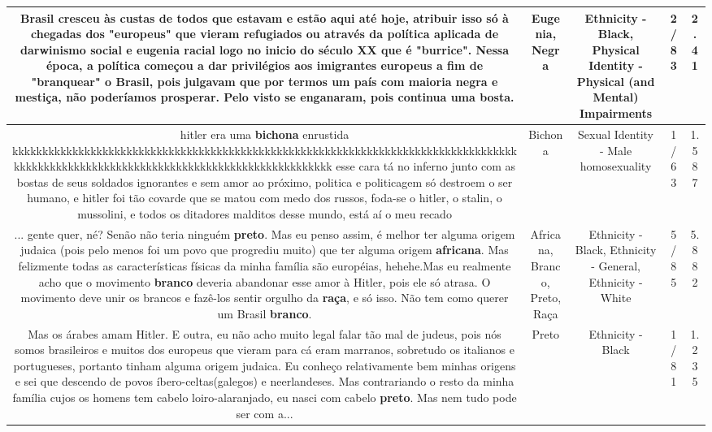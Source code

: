 \documentclass[11pt]{article}
\newlength\mylength
\begin{document}
\begin{center}
\begin{longtable}{|C{.65\mylength}|C{.30\mylength}|C{.12\mylength}|C{.12\mylength}|C{.12\mylength}|}
  \small Brasil cresceu às custas de todos que estavam e estão aqui até hoje, atribuir isso só à chegadas dos "europeus" que vieram refugiados ou através da política aplicada de darwinismo social e \textbf{eugenia} racial logo no inicio do século XX que é "burrice". Nessa época, a política começou a dar privilégios aos imigrantes europeus a fim de "branquear" o Brasil, pois julgavam que por termos um país com maioria \textbf{negra} e mestiça, não poderíamos prosperar. Pelo visto se enganaram, pois continua uma bosta.\normalsize   & Eugenia, Negra & Ethnicity - Black, Physical Identity - Physical (and Mental) Impairments & 2/83 & 2.41 \\  \hline
  \small hitler era uma \textbf{bichona} enrustida kkkkkkkkkkkkkkkkkkkkkkkkkkkkkkkkkkkkkkkkkkkkkkkkkkkkkkkkkkkkkkkkkkkkkkkkkkkkkkkkkkkkkkkkkkkkkkkkkkkkkkkkkkkkkkkkkkkkkkkkkkkkkkkkkkkkkkkkk  esse cara tá no inferno junto com as bostas de seus soldados ignorantes e sem amor ao próximo, politica e politicagem só destroem o ser humano, e hitler foi tão covarde que se matou com medo dos russos, foda-se o hitler, o stalin, o mussolini, e todos os ditadores malditos desse mundo, está aí o meu recado\normalsize   & Bichona & Sexual Identity - Male homosexuality & 1/63 & 1.587 \\  \hline
  \small ... gente quer, né? Senão não teria ninguém \textbf{preto}. Mas eu penso assim, é melhor ter alguma origem judaica (pois pelo menos foi um povo que progrediu muito) que ter alguma origem \textbf{africana}. Mas felizmente todas as características físicas da minha família são européias, hehehe.Mas eu realmente acho que o movimento \textbf{branco} deveria abandonar esse amor à Hitler, pois ele só atrasa. O movimento deve unir os brancos e fazê-los sentir orgulho da \textbf{raça}, e só isso. Não tem como querer um Brasil \textbf{branco}.\normalsize   & Africana, Branco, Preto, Raça & Ethnicity - Black, Ethnicity - General, Ethnicity - White & 5/85 & 5.882 \\  \hline
  \small Mas os árabes amam Hitler. E outra, eu não acho muito legal falar tão mal de judeus, pois nós somos brasileiros e muitos dos europeus que vieram para cá eram marranos, sobretudo os italianos e portugueses, portanto tinham alguma origem judaica. Eu conheço relativamente bem minhas origens e sei que descendo de povos íbero-celtas(galegos) e neerlandeses. Mas contrariando o resto da minha família cujos os homens tem cabelo loiro-alaranjado, eu nasci com cabelo \textbf{preto}. Mas nem tudo pode ser com a...\normalsize   & Preto & Ethnicity - Black & 1/81 & 1.235 \\  \hline

\end{longtable}
\end{center}
\end{document}
